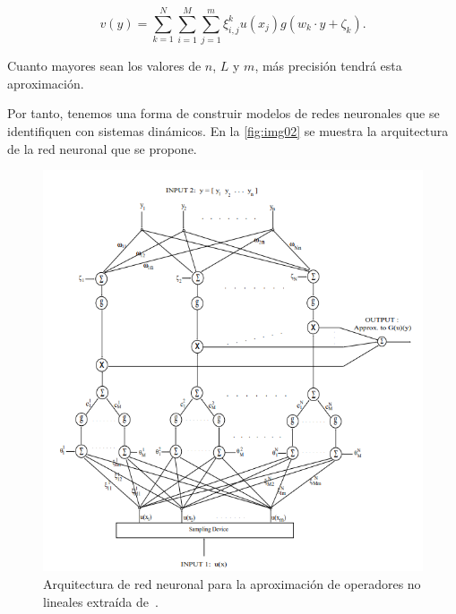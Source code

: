 \[v(y) = \sum_{k=1}^{N}\sum_{i=1}^{M}\sum_{j=1}^{m}\xi_{i,j}^{k}u(x_{j})g(w_{k}\cdot y+\zeta_{k}).\]

Cuanto mayores sean los valores de $n$, $L$ y $m$, más precisión tendrá esta aproximación. 

Por tanto, tenemos una forma de construir modelos de redes neuronales que se identifiquen con sistemas dinámicos. En la 
 \autoref{fig:img02} se muestra la arquitectura de la red neuronal que se propone. 

 \begin{figure}[ht]
    \centering
    \includegraphics[width=\textwidth]{img/img02.png}
    \caption{Arquitectura de red neuronal para la aproximación de operadores no lineales extraída de~\cite{chen1995universal}.}
    \label{fig:img02}
\end{figure}
\endinput

